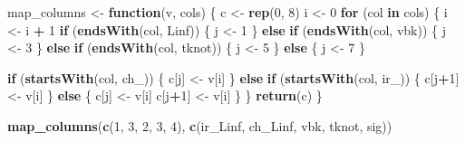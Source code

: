 \documentclass[
]{article}
\newenvironment{Shaded}{\begin{snugshade}}{\end{snugshade}}
\newcommand{\ControlFlowTok}[1]{\textcolor[rgb]{0.13,0.29,0.53}{\textbf{#1}}}
\newcommand{\DecValTok}[1]{\textcolor[rgb]{0.00,0.00,0.81}{#1}}
\newcommand{\KeywordTok}[1]{\textcolor[rgb]{0.13,0.29,0.53}{\textbf{#1}}}
\newcommand{\NormalTok}[1]{#1}
\newcommand{\OperatorTok}[1]{\textcolor[rgb]{0.81,0.36,0.00}{\textbf{#1}}}
\newcommand{\StringTok}[1]{\textcolor[rgb]{0.31,0.60,0.02}{#1}}
\begin{document}
\begin{Shaded}
\begin{Highlighting}[]
\NormalTok{map\_columns \textless{}{-}}\StringTok{ }\ControlFlowTok{function}\NormalTok{(v, cols) \{}
\NormalTok{    c \textless{}{-}}\StringTok{ }\KeywordTok{rep}\NormalTok{(}\DecValTok{0}\NormalTok{, }\DecValTok{8}\NormalTok{)}
\NormalTok{    i \textless{}{-}}\StringTok{ }\DecValTok{0}
    \ControlFlowTok{for}\NormalTok{ (col }\ControlFlowTok{in}\NormalTok{ cols) \{}
\NormalTok{        i \textless{}{-}}\StringTok{ }\NormalTok{i }\OperatorTok{+}\StringTok{ }\DecValTok{1}
        \ControlFlowTok{if}\NormalTok{ (}\KeywordTok{endsWith}\NormalTok{(col, }\StringTok{\textquotesingle{}Linf\textquotesingle{}}\NormalTok{)) \{}
\NormalTok{            j \textless{}{-}}\StringTok{ }\DecValTok{1}
\NormalTok{        \} }\ControlFlowTok{else} \ControlFlowTok{if}\NormalTok{ (}\KeywordTok{endsWith}\NormalTok{(col, }\StringTok{\textquotesingle{}vbk\textquotesingle{}}\NormalTok{)) \{}
\NormalTok{            j \textless{}{-}}\StringTok{ }\DecValTok{3}
\NormalTok{        \} }\ControlFlowTok{else} \ControlFlowTok{if}\NormalTok{ (}\KeywordTok{endsWith}\NormalTok{(col, }\StringTok{\textquotesingle{}tknot\textquotesingle{}}\NormalTok{)) \{}
\NormalTok{            j \textless{}{-}}\StringTok{ }\DecValTok{5}
\NormalTok{        \} }\ControlFlowTok{else}\NormalTok{ \{}
\NormalTok{            j \textless{}{-}}\StringTok{ }\DecValTok{7}
\NormalTok{        \}}

        \ControlFlowTok{if}\NormalTok{ (}\KeywordTok{startsWith}\NormalTok{(col, }\StringTok{\textquotesingle{}ch\_\textquotesingle{}}\NormalTok{)) \{}
\NormalTok{            c[j] \textless{}{-}}\StringTok{ }\NormalTok{v[i]}
\NormalTok{        \} }\ControlFlowTok{else} \ControlFlowTok{if}\NormalTok{ (}\KeywordTok{startsWith}\NormalTok{(col, }\StringTok{\textquotesingle{}ir\_\textquotesingle{}}\NormalTok{)) \{}
\NormalTok{            c[j}\OperatorTok{+}\DecValTok{1}\NormalTok{] \textless{}{-}}\StringTok{ }\NormalTok{v[i]}
\NormalTok{        \} }\ControlFlowTok{else}\NormalTok{ \{}
\NormalTok{            c[j] \textless{}{-}}\StringTok{ }\NormalTok{v[i]}
\NormalTok{            c[j}\OperatorTok{+}\DecValTok{1}\NormalTok{] \textless{}{-}}\StringTok{ }\NormalTok{v[i]}
\NormalTok{        \}}
\NormalTok{    \}}
    \KeywordTok{return}\NormalTok{(c)}
\NormalTok{\}}

\KeywordTok{map\_columns}\NormalTok{(}\KeywordTok{c}\NormalTok{(}\DecValTok{1}\NormalTok{, }\DecValTok{3}\NormalTok{, }\DecValTok{2}\NormalTok{, }\DecValTok{3}\NormalTok{, }\DecValTok{4}\NormalTok{), }\KeywordTok{c}\NormalTok{(}\StringTok{\textquotesingle{}ir\_Linf\textquotesingle{}}\NormalTok{, }\StringTok{\textquotesingle{}ch\_Linf\textquotesingle{}}\NormalTok{, }\StringTok{\textquotesingle{}vbk\textquotesingle{}}\NormalTok{, }\StringTok{\textquotesingle{}tknot\textquotesingle{}}\NormalTok{, }\StringTok{\textquotesingle{}sig\textquotesingle{}}\NormalTok{))}
\end{Highlighting}
\end{Shaded}
\end{document}
